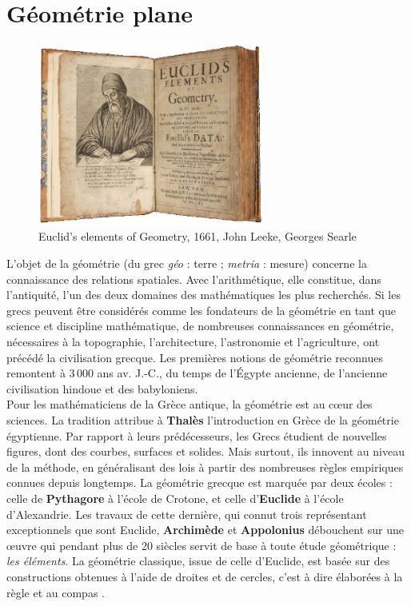 \chapter{Géométrie plane} \label{G9}

\bigskip

\begin{figure}[h]
   \centering
      \includegraphics[height=6cm]{Geometrie/Images/G9_intro_Euclide}
   \caption{Euclid's elements of Geometry, 1661, John Leeke, Georges Searle}
\end{figure}

\begin{prerequis}
   L'objet de la géométrie (du grec \textit{géo} : terre ; \textit{metria} : mesure) concerne la connaissance des relations spatiales. Avec l'arithmétique, elle constitue, dans l'antiquité, l'un des deux domaines des mathématiques les plus recherchés. Si les grecs peuvent être considérés comme les fondateurs de la géométrie en tant que science et discipline mathématique, de nombreuses connaissances en géométrie, nécessaires à la topographie, l'architecture, l'astronomie et l'agriculture, ont précédé la civilisation grecque. Les premières notions de géométrie reconnues remontent à 3\,000 ans av. J.-C., du temps de l'Égypte ancienne, de l'ancienne civilisation hindoue et des babyloniens. \\
   Pour les mathématiciens de la Grèce antique, la géométrie est au c\oe ur des sciences. La tradition attribue à \textbf{Thalès} l'introduction en Grèce de la géométrie égyptienne. Par rapport à leurs prédécesseurs, les Grecs étudient de nouvelles figures, dont des courbes, surfaces et solides. Mais surtout, ils innovent au niveau de la méthode, en généralisant des lois à partir des nombreuses règles empiriques connues depuis longtemps. La géométrie grecque est marquée par deux écoles : celle de \textbf{Pythagore} à l'école de Crotone, et celle d'\textbf{Euclide} à l'école d'Alexandrie. Les travaux de cette dernière, qui connut trois représentant exceptionnels que sont Euclide, \textbf{Archimède} et \textbf{Appolonius} débouchent sur une \oe uvre qui pendant plus de 20 siècles servit de base à toute étude géométrique : \textit{les éléments}. La géométrie classique, issue de celle d'Euclide, est basée sur des constructions obtenues à l'aide de droites et de cercles, c'est à dire élaborées \og à la règle et au compas \fg{}.
\end{prerequis}


